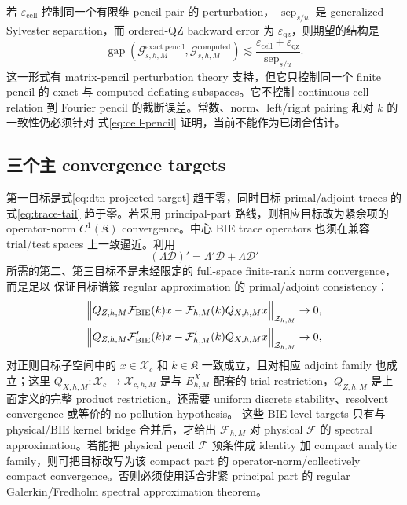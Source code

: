 \documentclass[UTF8,fontset=fandol,11pt,a4paper]{ctexart}
\newcommand{\cF}{\mathcal F}
\newcommand{\cG}{\mathcal G}
\newcommand{\cD}{\mathcal D}
\begin{document}
若 $\varepsilon_{\mathrm{cell}}$ 控制同一个有限维 pencil pair 的 perturbation，
$\operatorname{sep}_{s/u}$ 是 generalized Sylvester separation，而 ordered-QZ backward
error 为 $\varepsilon_{\mathrm{qz}}$，则期望的结构是
\[
  \operatorname{gap}(\cG_{s,h,M}^{\mathrm{exact\ pencil}},
  \cG_{s,h,M}^{\mathrm{computed}})
  \lesssim
  \frac{\varepsilon_{\mathrm{cell}}+\varepsilon_{\mathrm{qz}}}
       {\operatorname{sep}_{s/u}}.
\]
这一形式有 matrix-pencil perturbation theory 支持，但它只控制同一个 finite pencil 的
exact 与 computed deflating subspaces。它不控制 continuous cell relation 到 Fourier
pencil 的截断误差。常数、norm、left/right pairing 和对 $k$ 的一致性仍必须针对
式\eqref{eq:cell-pencil} 证明，当前不能作为已闭合估计。

\subsection{三个主 convergence targets}

第一目标是式\eqref{eq:dtn-projected-target} 趋于零，同时目标 primal/adjoint traces 的
式\eqref{eq:trace-tail} 趋于零。若采用 principal-part 路线，则相应目标改为紧余项的
operator-norm $C^1(\mathfrak K)$ convergence。中心 BIE trace operators 也须在兼容 trial/test
spaces 上一致逼近。利用
\[
  (\Lambda\cD)'=\Lambda'\cD+\Lambda\cD'
\]
所需的第二、第三目标不是未经限定的 full-space finite-rank norm convergence，而是足以
保证目标谱簇 regular approximation 的 primal/adjoint consistency：
\begin{equation}
  \begin{aligned}
    &\Bigl\|Q_{Z,h,M}\cF_{\mathrm{BIE}}(k)x
      -\cF_{h,M}(k)Q_{X,h,M}x\Bigr\|_{\mathcal Z_{h,M}}\to0,\\
    &\Bigl\|Q_{Z,h,M}\cF_{\mathrm{BIE}}'(k)x
      -\cF'_{h,M}(k)Q_{X,h,M}x\Bigr\|_{\mathcal Z_{h,M}}\to0,
  \end{aligned}
  \label{eq:f-targets}
\end{equation}
对正则目标子空间中的 $x\in\mathcal X_c$ 和 $k\in\mathfrak K$ 一致成立，且对相应
adjoint family 也成立；这里
$Q_{X,h,M}:\mathcal X_c\to\mathcal X_{c,h,M}$ 是与 $E_{h,M}^X$ 配套的 trial
restriction，$Q_{Z,h,M}$ 是上面定义的完整 product restriction。还需要
uniform discrete stability、resolvent convergence 或等价的 no-pollution hypothesis。
这些 BIE-level targets 只有与 physical/BIE kernel bridge 合并后，才给出
$\cF_{h,M}$ 对 physical $\cF$ 的 spectral approximation。若能把 physical pencil
$\cF$ 预条件成 identity 加 compact analytic family，则可把目标改写为该 compact part
的 operator-norm/collectively compact convergence。否则必须使用适合非紧 principal part
的 regular Galerkin/Fredholm spectral approximation theorem。
\end{document}
